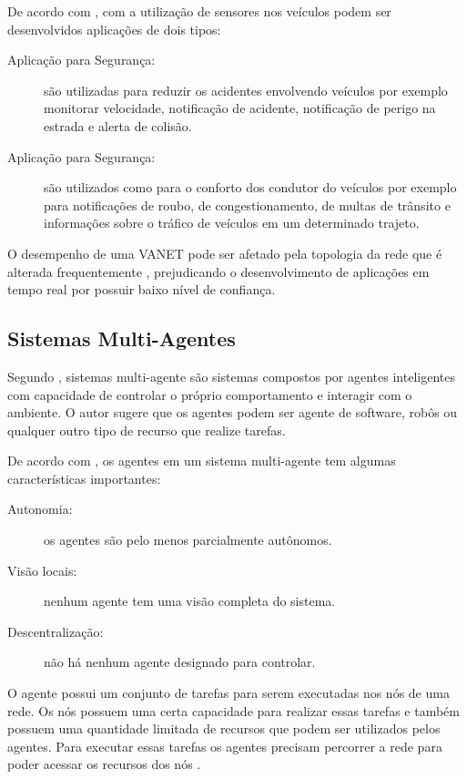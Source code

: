 De acordo com \cite{Piran:2011}, com a utilização de sensores nos veículos podem ser desenvolvidos aplicações de dois tipos:

\begin{description}
\item[Aplicação para Segurança:] são utilizadas para reduzir os acidentes envolvendo veículos por exemplo monitorar velocidade, notificação de acidente, notificação de perigo na estrada e alerta de colisão.

\item[Aplicação para Segurança:] são utilizados como para o conforto dos condutor do veículos  por exemplo para notificações de roubo, de congestionamento, de multas de trânsito e informações sobre o tráfico de veículos em um determinado trajeto.
\end{description}

O desempenho de uma VANET pode ser afetado pela topologia da rede que é alterada frequentemente \cite{Lidstrom:2010}, prejudicando o desenvolvimento de aplicações em tempo real por possuir baixo nível de confiança.

\subsection{Sistemas Multi-Agentes}

Segundo \cite{Woolridge:2001}, sistemas multi-agente são sistemas compostos por agentes inteligentes com capacidade de controlar o próprio comportamento e interagir com o ambiente. O autor \cite{Woolridge:2001} sugere que os agentes podem ser agente de software, robôs ou qualquer outro tipo de recurso que realize tarefas.

De acordo com \cite{Woolridge:2001}, os agentes em um sistema multi-agente tem algumas características importantes: 

\begin{description}
\item[Autonomia:] os agentes são pelo menos parcialmente autônomos.

\item[Visão locais:] nenhum agente tem uma visão completa do sistema.

\item[Descentralização:] não há nenhum agente designado para controlar.

\end{description}

O agente possui um conjunto de tarefas para serem executadas nos nós de uma rede. Os nós possuem uma certa capacidade para realizar essas tarefas e também possuem uma quantidade limitada de recursos que podem ser utilizados pelos agentes. Para executar essas tarefas os agentes precisam percorrer a rede para poder acessar os recursos dos nós \cite{Shehory:1998}.

